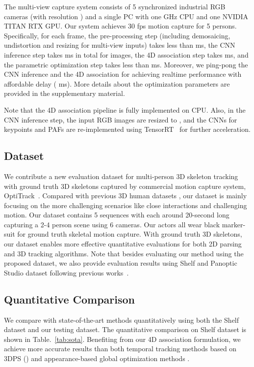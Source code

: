 \documentclass[10pt,twocolumn,letterpaper]{article}
\begin{document}
The multi-view capture system consists of 5 synchronized industrial RGB cameras (with resolution ) and a single PC with one  GHz CPU and one NVIDIA TITAN RTX GPU. Our system achieves 30 fps motion capture for 5 persons. Specifically, for each frame, the pre-processing step (including demosaicing, undistortion and resizing for multi-view inputs) takes less than  ms, the CNN inference step takes  ms in total for  images, the 4D association step takes  ms, and the parametric optimization step takes less than  ms. Moreover, we ping-pong the CNN inference and the 4D association for achieving realtime performance with affordable delay ( ms).
More details about the optimization parameters are provided in the supplementary material.


Note that the 4D association pipeline is fully implemented on CPU. Also, in the CNN inference step, the input RGB images are resized to , and the CNNs for keypoints and PAFs are re-implemented using TensorRT~\cite{vanholder2016tensorrt} for further acceleration.

\vspace{-2mm}
\subsection{Dataset}
\label{sec:dataset}
We contribute a new evaluation dataset for multi-person 3D skeleton tracking with ground truth 3D skeletons captured by commercial motion capture system, OptiTrack~\cite{optitrack}. Compared with previous 3D human datasets \cite{kazemi2013kthfootball,ionescu2013h36m,mono-3dhp2017,joo2019panoptic,belagiannis2014temporal3DPS,aa2011utrecht}, our dataset is mainly focusing on the more challenging scenarios like close interactions and challenging motion. Our dataset contains 5 sequences with each around 20-second long capturing a 2-4 person scene using 6 cameras. Our actors all wear black marker-suit for ground truth skeletal motion capture. With ground truth 3D skeletons, our dataset enables more effective quantitative evaluations for both 2D parsing and 3D tracking algorithms. Note that besides evaluating our method using the proposed dataset, we also provide evaluation results using Shelf and Panoptic Studio dataset following previous works~\cite{belagiannis2014temporal3DPS,belagiannis20163dps,dong2019fast}.









\subsection{Quantitative Comparison}
\label{sec:sec:quantitative}
We compare with state-of-the-art methods quantitatively using both the Shelf dataset and our testing dataset.
The quantitative comparison on Shelf dataset is shown in Table.~\ref{tab:sota}.
Benefiting from our 4D association formulation, we achieve more accurate results than both temporal tracking methods based on 3DPS (\cite{belagiannis2014temporal3DPS,belagiannis20143d,belagiannis20163dps,ershadi2018multiple}) and appearance-based global optimization methods \cite{dong2019fast}.
\end{document}
